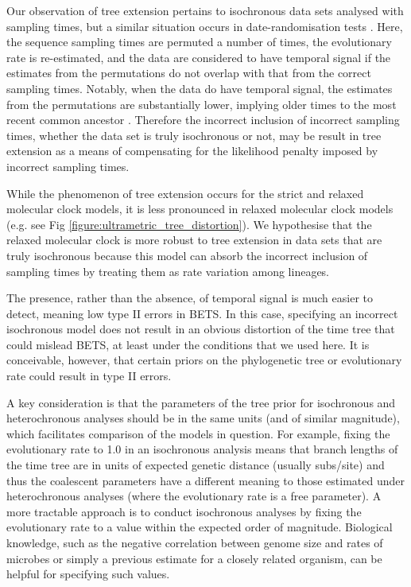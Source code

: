 \documentclass[10pt,letterpaper]{article}
\begin{document}
Our observation of tree extension pertains to isochronous data sets analysed with sampling times, but a similar situation occurs in date-randomisation tests \cite{ramsden2009hantavirus}. Here, the sequence sampling times are permuted a number of times, the evolutionary rate is re-estimated, and the data are considered to have temporal signal if the estimates from the permutations do not overlap with that from the correct sampling times. Notably, when the data do have temporal signal, the estimates from the permutations are substantially lower, implying older times to the most recent common ancestor \cite{rieux2016inferences}. Therefore the incorrect inclusion of incorrect sampling times, whether the data set is truly isochronous or not, may be result in tree extension as a means of compensating for the likelihood penalty imposed by incorrect sampling times.

While the phenomenon of tree extension occurs for the strict and relaxed molecular clock models, it is less pronounced in relaxed molecular clock models (e.g. see Fig \ref{figure:ultrametric_tree_distortion}). We hypothesise that the relaxed molecular clock is more robust to tree extension in data sets that are truly isochronous because this model can absorb the incorrect inclusion of sampling times by treating them as rate variation among lineages.

The presence, rather than the absence, of temporal signal is much easier to detect, meaning low type II errors in BETS. In this case, specifying an incorrect isochronous model does not result in an obvious distortion of the time tree that could mislead BETS, at least under the conditions that we used here. It is conceivable, however, that certain priors on the phylogenetic tree or evolutionary rate could result in type II errors. 

A key consideration is that the parameters of the tree prior for isochronous and heterochronous analyses should be in the same units (and of similar magnitude), which facilitates comparison of the models in question. For example, fixing the evolutionary rate to 1.0 in an isochronous analysis means that branch lengths of the time tree are in units of expected genetic distance (usually subs/site) and thus the coalescent parameters have a different meaning to those estimated under heterochronous analyses (where the evolutionary rate is a free parameter). A more tractable approach is to conduct isochronous analyses by fixing the evolutionary rate to a value within the expected order of magnitude. Biological knowledge, such as the negative correlation between genome size and rates of microbes \cite{sanjuan2012molecular, duchene2016genome} or simply a previous estimate for a closely related organism, can be helpful for specifying such values.
\end{document}

